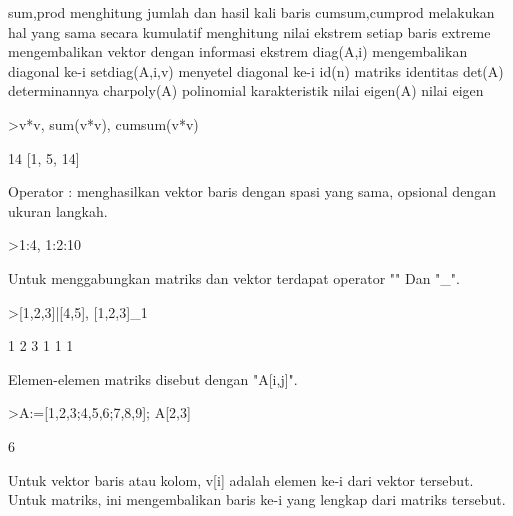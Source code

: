 \documentclass[a4paper,10pt]{article}
\begin{document}
\begin{eulernotebook}
\begin{eulercomment}
\begin{eulercomment}
\begin{eulercomment}
\begin{eulercomment}
\begin{eulercomment}
\begin{eulercomment}
\begin{eulercomment}
\end{eulercomment}
\begin{eulerttcomment}
  sum,prod menghitung jumlah dan hasil kali baris
  cumsum,cumprod melakukan hal yang sama secara kumulatif
  menghitung nilai ekstrem setiap baris
  extreme mengembalikan vektor dengan informasi ekstrem
  diag(A,i) mengembalikan diagonal ke-i
  setdiag(A,i,v) menyetel diagonal ke-i
  id(n) matriks identitas
  det(A) determinannya
  charpoly(A) polinomial karakteristik
  nilai eigen(A) nilai eigen
\end{eulerttcomment}
\begin{eulerprompt}
>v*v, sum(v*v), cumsum(v*v)
\end{eulerprompt}
\begin{euleroutput}
  [1,  4,  9]
  14
  [1,  5,  14]
\end{euleroutput}
\begin{eulercomment}
Operator : menghasilkan vektor baris dengan spasi yang sama, opsional
dengan ukuran langkah.
\end{eulercomment}
\begin{eulerprompt}
>1:4, 1:2:10
\end{eulerprompt}
\begin{euleroutput}
  [1,  2,  3,  4]
  [1,  3,  5,  7,  9]
\end{euleroutput}
\begin{eulercomment}
Untuk menggabungkan matriks dan vektor terdapat operator "\textbar{}" Dan "\_".
\end{eulercomment}
\begin{eulerprompt}
>[1,2,3]|[4,5], [1,2,3]_1
\end{eulerprompt}
\begin{euleroutput}
  [1,  2,  3,  4,  5]
              1             2             3 
              1             1             1 
\end{euleroutput}
\begin{eulercomment}
Elemen-elemen matriks disebut dengan "A[i,j]".
\end{eulercomment}
\begin{eulerprompt}
>A:=[1,2,3;4,5,6;7,8,9]; A[2,3]
\end{eulerprompt}
\begin{euleroutput}
  6
\end{euleroutput}
\begin{eulercomment}
Untuk vektor baris atau kolom, v[i] adalah elemen ke-i dari vektor
tersebut. Untuk matriks, ini mengembalikan baris ke-i yang lengkap
dari matriks tersebut.

\end{eulercomment}
\end{eulercomment}
\end{eulercomment}
\end{eulercomment}
\end{eulercomment}
\end{eulercomment}
\end{eulercomment}
\end{eulernotebook}
\end{document}
